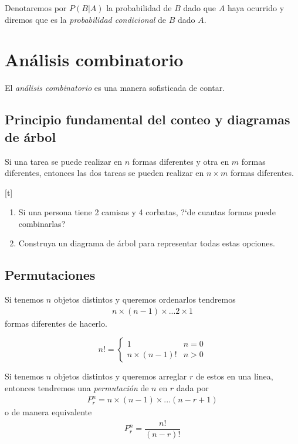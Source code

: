   Denotaremos por $P(B|A)$
 la probabilidad de $B$ dado que $A$ haya ocurrido y diremos que es la \emph{probabilidad condicional} de $B$ dado $A.$
\section{Análisis combinatorio}

{}
El \emph{análisis combinatorio} es una manera sofisticada de contar.


\subsection{Principio fundamental del conteo y diagramas de árbol}

Si una tarea se puede realizar en $n$ formas diferentes y otra en $m$ formas diferentes, entonces las dos tareas se pueden realizar en $n\times m$ formas diferentes.


[t]{}
\begin{exmp}
	\label{exmp:1.14}
\end{exmp}
\begin{enumerate}
	\item Si una persona tiene 2 camisas y 4 corbatas, ?`de cuantas formas puede combinarlas?
	\item Construya un diagrama de árbol para representar todas estas opciones.
\end{enumerate}



\subsection{Permutaciones}
{}
Si tenemos $n$ objetos distintos y queremos ordenarlos tendremos
\begin{align*}
	n \times (n-1) \times ... 2\times 1
\end{align*} formas diferentes de hacerlo.

{}
\begin{defn}[$n$ factorial]
	\begin{equation}
		n! = \begin{cases}
			1 & n=0 \\
			n\times(n-1)! & n>0
		\end{cases}
	\end{equation}
	
\end{defn}


{}
Si tenemos $n$ objetos distintos y queremos arreglar $r$ de estos en una linea, entonces tendremos una \emph{permutación} de $n$ en $r$ dada por
\begin{align}
	\label{1.25}
	P^{n}_{r}=n\times(n-1)\times...\left( n-r+1 \right)
\end{align} 
o de manera equivalente
\begin{align}
	\label{1.27}
	P^{n}_{r}=\dfrac{n!}{(n-r)!}
\end{align}


